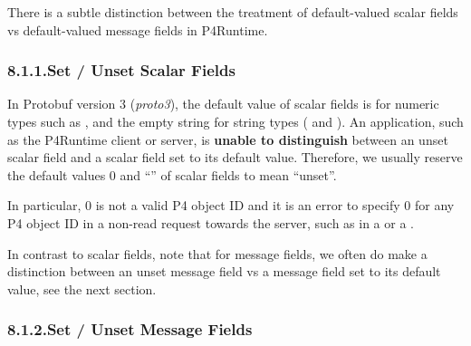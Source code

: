 \documentclass[11pt]{article}
\begin{document}
{%
\noindent{}There is a subtle distinction between the treatment of default-valued scalar
fields vs default-valued message fields in P4Runtime.%

\subsubsection{8.1.1.\hspace*{0.5em}Set / Unset Scalar Fields}\label{sec-set-unset-scalar-fields}%

\noindent{}In Protobuf version 3 (\emph{proto3}), the default value of scalar fields is  for
numeric types such as , and the empty string  for string types
( and ). An application, such as the P4Runtime client or
server, is \textbf{unable to distinguish} between an unset scalar field and a scalar
field set to its default value. Therefore, we usually reserve the default
values 0 and \textquotedblleft{}\textquotedblright{} of scalar fields to mean \textquotedblleft{}unset\textquotedblright{}.%

In particular, 0 is not a valid P4 object ID and it
is an error to specify 0 for any P4 object ID in a non-read request towards the
server, such as in a  or a .%

In contrast to scalar fields, note that for message fields, we often do make
a distinction between an unset message field vs a message field set to its
default value, see the next section.%

\subsubsection{8.1.2.\hspace*{0.5em}Set / Unset Message Fields}\label{sec-set-unset-message-fields}%

}
\end{document}
